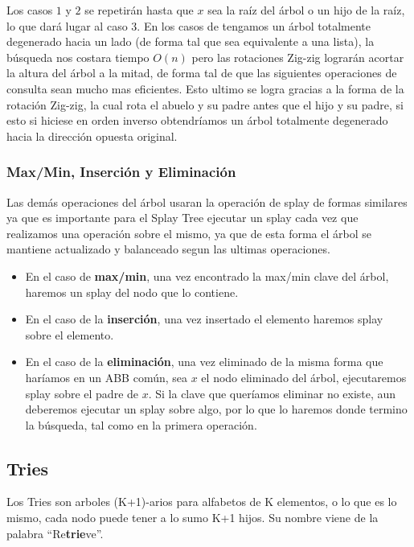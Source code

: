 Los casos $1$ y $2$ se repetir\'an hasta que $x$ sea la ra\'iz del \'arbol o un hijo de la ra\'iz, lo que dar\'a lugar al caso $3$. En los casos de tengamos un \'arbol totalmente degenerado hacia un lado (de forma tal que sea equivalente a una lista), la b\'usqueda nos costara tiempo $O(n)$ pero las rotaciones Zig-zig lograr\'an acortar la altura del \'arbol a la mitad, de forma tal de que las siguientes operaciones de consulta sean mucho mas eficientes. Esto ultimo se logra gracias a la forma de la rotaci\'on Zig-zig, la cual rota el abuelo y su padre antes que el hijo y su padre, si esto si hiciese en orden inverso obtendr\'iamos un \'arbol totalmente degenerado hacia la direcci\'on opuesta original. 

\subsubsection{Max/Min, Inserci\'on y Eliminaci\'on}

Las dem\'as operaciones del \'arbol usaran la operaci\'on de splay de formas similares ya que es importante para el Splay Tree ejecutar un splay cada vez que realizamos una operaci\'on sobre el mismo, ya que de esta forma el \'arbol se mantiene actualizado y balanceado segun las ultimas operaciones.

\begin{itemize}
 \item En el caso de \textbf{max/min}, una vez encontrado la max/min clave del \'arbol, haremos un splay del nodo que lo contiene.
 \item En el caso de la \textbf{inserci\'on}, una vez insertado el elemento haremos splay sobre el elemento.
 \item En el caso de la \textbf{eliminaci\'on}, una vez eliminado de la misma forma que har\'iamos en un ABB com\'un, sea $x$ el nodo eliminado del \'arbol, ejecutaremos splay sobre el padre de $x$. Si la clave que quer\'iamos eliminar no existe, aun deberemos ejecutar un splay sobre algo, por lo que lo haremos donde termino la b\'usqueda, tal como en la primera operaci\'on.
\end{itemize}

\subsection{Tries}
Los Tries son arboles (K+1)-arios para alfabetos de K elementos, o lo que es lo mismo, cada nodo puede tener a lo sumo K+1 hijos. Su nombre viene de la palabra ``Re\textbf{trie}ve''.

